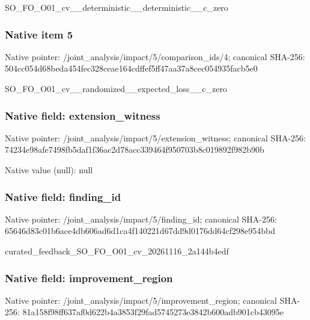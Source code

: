 \documentclass[10pt,a4paper]{article}
\begin{document}
\begingroup\raggedright\sloppy SO\_\allowbreak{}FO\_\allowbreak{}O01\_\allowbreak{}cv\_\allowbreak{}\_\allowbreak{}deterministic\_\allowbreak{}\_\allowbreak{}deterministic\_\allowbreak{}\_\allowbreak{}c\_\allowbreak{}zero\par\endgroup

\subsubsection{Native item 5}
Native pointer: /joint\_\allowbreak{}analysis/impact/5/comparison\_\allowbreak{}ids/4; canonical SHA-256: 504cc054d68beda454fec328ceae164cdffef5ff47aa37a8cec054935facb5e0

\begingroup\raggedright\sloppy SO\_\allowbreak{}FO\_\allowbreak{}O01\_\allowbreak{}cv\_\allowbreak{}\_\allowbreak{}randomized\_\allowbreak{}\_\allowbreak{}expected\_\allowbreak{}loss\_\allowbreak{}\_\allowbreak{}c\_\allowbreak{}zero\par\endgroup

\subsubsection{Native field: extension\_\allowbreak{}witness}
Native pointer: /joint\_\allowbreak{}analysis/impact/5/extension\_\allowbreak{}witness; canonical SHA-256: 74234e98afe7498fb5daf1f36ac2d78acc339464f950703b8c019892f982b90b

Native value (null): null

\subsubsection{Native field: finding\_\allowbreak{}id}
Native pointer: /joint\_\allowbreak{}analysis/impact/5/finding\_\allowbreak{}id; canonical SHA-256: 65646d83c01b6ace4db606ad6d1ca4f140221d67dd9d0176dd64cf298e954bbd

\begingroup\raggedright\sloppy curated\_\allowbreak{}feedback\_\allowbreak{}SO\_\allowbreak{}FO\_\allowbreak{}O01\_\allowbreak{}cv\_\allowbreak{}20261116\_\allowbreak{}2a144b4edf\par\endgroup

\subsubsection{Native field: improvement\_\allowbreak{}region}
Native pointer: /joint\_\allowbreak{}analysis/impact/5/improvement\_\allowbreak{}region; canonical SHA-256: 81a158f98ff637af0d622b4a3853f29fad5745273e3842b600adb901cb43095e
\end{document}
